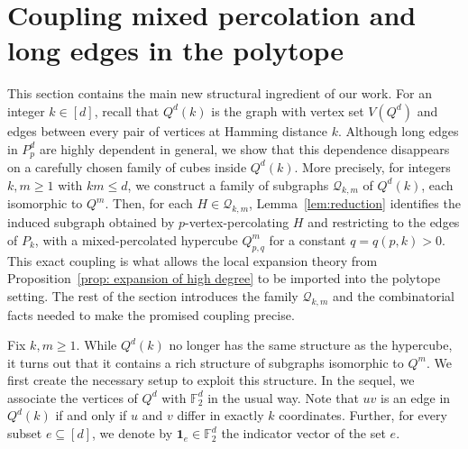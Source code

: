 \documentclass{article}
\theoremstyle{definition}
\newcommand{\lyuc}[1]{{\color{blue}{ [~Lyuben:\ }\emph{#1}\textbf{~]}}}
\newcommand{\cQ}{\mathcal{Q}}
\begin{document}
\section{Coupling mixed percolation and long edges in the polytope}\label{section: family of cubes}
This section contains the main new structural ingredient of our work.
For an integer $k\in [d]$, recall that $Q^d(k)$ is the graph with vertex set $V(Q^d)$ and edges between every pair of vertices at Hamming distance $k$.
Although long edges in $P_p^d$ are highly dependent in general, we show that this dependence disappears on a carefully chosen family of cubes inside $Q^d(k)$. 
More precisely, for integers $k,m\ge 1$ with $km\le d$, we construct a family of subgraphs $\cQ_{k,m}$ of $Q^d(k)$, each isomorphic to $Q^m$. 
Then, for each $H\in\cQ_{k,m}$, Lemma~\ref{lem:reduction} identifies the induced subgraph obtained by $p$-vertex-percolating $H$ and restricting to the edges of $P_k$, with a mixed-percolated hypercube $Q^m_{p,q}$ for a constant $q=q(p,k)>0$. 
This exact coupling is what allows the local expansion theory from Proposition~\ref{prop: expansion of high degree} to be imported into the polytope setting. The rest of the section introduces the family $\cQ_{k,m}$ and the combinatorial facts needed to make the promised coupling precise.

Fix $k,m\ge 1$. While $Q^d(k)$ no longer has the same structure as the hypercube, it turns out that it contains a rich structure of subgraphs isomorphic to $Q^m$. 
We first create the necessary setup to exploit this structure. 
In the sequel, we associate the vertices of $Q^d$ with $\mathbb F_2^d$ in the usual way.
Note that $uv$ is an edge in $Q^d(k)$ if and only if $u$ and $v$ differ in exactly $k$ coordinates. Further, for every subset $e\subseteq [d]$, we denote by $\mathbf{1}_e\in\mathbb F_2^d$ the indicator vector of the set $e$.%
\end{document}
